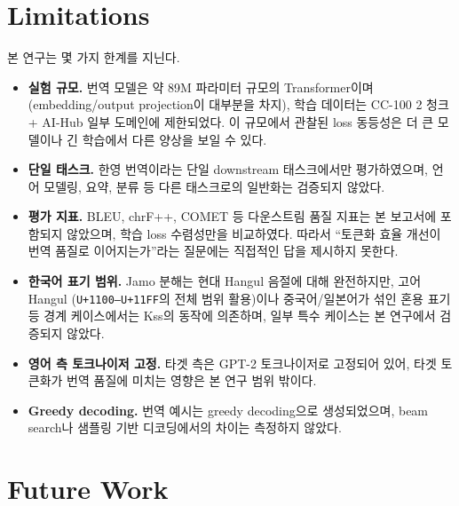 \documentclass[sigconf,nonacm]{acmart}
\begin{document}
\section{Limitations}
\label{sec:limitations}

본 연구는 몇 가지 한계를 지닌다.
\begin{itemize}
    \item \textbf{실험 규모.} 번역 모델은 약 89M 파라미터 규모의 Transformer이며
    (embedding/output projection이 대부분을 차지), 학습 데이터는
    CC-100 2 청크 + AI-Hub 일부 도메인에 제한되었다. 이 규모에서 관찰된 loss 동등성은 더 큰 모델이나
    긴 학습에서 다른 양상을 보일 수 있다.
    \item \textbf{단일 태스크.} 한영 번역이라는 단일 downstream 태스크에서만 평가하였으며,
    언어 모델링, 요약, 분류 등 다른 태스크로의 일반화는 검증되지 않았다.
    \item \textbf{평가 지표.} BLEU, chrF++, COMET 등 다운스트림 품질 지표는 본 보고서에 포함되지
    않았으며, 학습 loss 수렴성만을 비교하였다. 따라서 ``토큰화 효율 개선이 번역 품질로 이어지는가''라는
    질문에는 직접적인 답을 제시하지 못한다.
    \item \textbf{한국어 표기 범위.} Jamo 분해는 현대 Hangul 음절에 대해 완전하지만, 고어 Hangul
    (\texttt{U+1100--U+11FF}의 전체 범위 활용)이나 중국어/일본어가 섞인 혼용 표기 등 경계
    케이스에서는 Kss의 동작에 의존하며, 일부 특수 케이스는 본 연구에서 검증되지 않았다.
    \item \textbf{영어 측 토크나이저 고정.} 타겟 측은 GPT-2 토크나이저로 고정되어 있어, 타겟 토큰화가
    번역 품질에 미치는 영향은 본 연구 범위 밖이다.
    \item \textbf{Greedy decoding.} 번역 예시는 greedy decoding으로 생성되었으며, beam search나
    샘플링 기반 디코딩에서의 차이는 측정하지 않았다.
\end{itemize}

\section{Future Work}
\label{sec:future}
\end{document}
